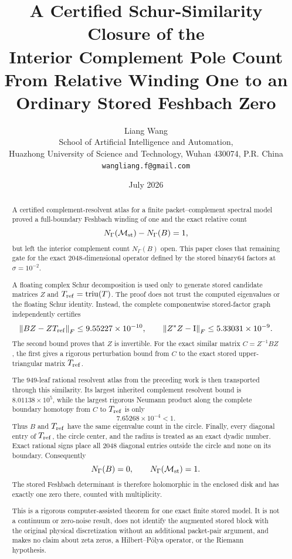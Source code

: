 \documentclass[11pt]{article}
\title{\textbf{A Certified Schur-Similarity Closure of the\\
Interior Complement Pole Count}\\[0.35em]
\large From Relative Winding One to an Ordinary Stored Feshbach Zero}
\author{Liang Wang\\
\small School of Artificial Intelligence and Automation,\\[-0.2em]
\small Huazhong University of Science and Technology, Wuhan 430074, P.R. China\\
\small \texttt{wangliang.f@gmail.com}}
\date{July 2026}
\theoremstyle{definition}
\theoremstyle{remark}
\newcommand{\Id}{\mathrm I}
\newcommand{\norm}[1]{\left\lVert#1\right\rVert}
\newcommand{\Maug}{\mathcal M_{\rm st}}
\newcommand{\Tref}{T_{\rm ref}}
\begin{document}
\maketitle

\begin{abstract}
A certified complement-resolvent atlas for a finite packet--complement
spectral model proved a full-boundary Feshbach winding of one and the exact
relative count
\[
 N_\Gamma(\Maug)-N_\Gamma(B)=1,
\]
but left the interior complement count \(N_\Gamma(B)\) open.  This paper
closes that remaining gate for the exact \(2048\)-dimensional operator
defined by the stored binary64 factors at \(\sigma=10^{-2}\).

A floating complex Schur decomposition is used only to generate stored
candidate matrices \(Z\) and
\(\Tref=\operatorname{triu}(T)\).  The proof does not trust the computed
eigenvalues or the floating Schur identity.  Instead, the complete
componentwise stored-factor graph independently certifies
\[
 \norm{BZ-Z\Tref}_F\leq 9.55227\times10^{-10},
 \qquad
 \norm{Z^*Z-\Id}_F\leq5.33031\times10^{-9}.
\]
The second bound proves that \(Z\) is invertible.  For the exact similar
matrix \(C=Z^{-1}BZ\), the first gives a rigorous perturbation bound from
\(C\) to the exact stored upper-triangular matrix \(\Tref\).

The \(949\)-leaf rational resolvent atlas from the preceding work is then
transported through this similarity.  Its largest inherited complement
resolvent bound is \(8.01138\times10^5\), while the largest rigorous
Neumann product along the complete boundary homotopy from \(C\) to
\(\Tref\) is only
\[
 7.65268\times10^{-4}<1.
\]
Thus \(B\) and \(\Tref\) have the same eigenvalue count in the circle.
Finally, every diagonal entry of \(\Tref\), the circle center, and the
radius is treated as an exact dyadic number.  Exact rational signs place all
\(2048\) diagonal entries outside the circle and none on its boundary.
Consequently
\[
 N_\Gamma(B)=0,\qquad N_\Gamma(\Maug)=1.
\]
The stored Feshbach determinant is therefore holomorphic in the enclosed
disk and has exactly one zero there, counted with multiplicity.

This is a rigorous computer-assisted theorem for one exact finite stored
model.  It is not a continuum or zero-noise result, does not identify the
augmented stored block with the original physical discretization without
an additional packet-pair argument, and makes no claim about zeta zeros,
a Hilbert--P\'olya operator, or the Riemann hypothesis.
\end{abstract}
\end{document}
